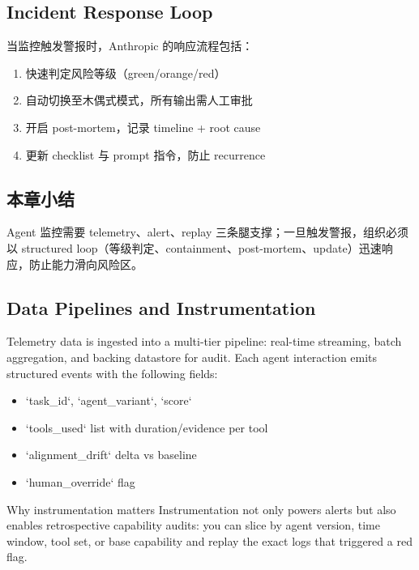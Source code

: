 \documentclass[a4paper]{article}
\begin{document}
\subsection{Incident Response Loop}

当监控触发警报时，Anthropic 的响应流程包括：

\begin{enumerate}
    \item 快速判定风险等级（green/orange/red）
    \item 自动切换至木偶式模式，所有输出需人工审批
    \item 开启 post-mortem，记录 timeline + root cause
    \item 更新 checklist 与 prompt 指令，防止 recurrence
\end{enumerate}

\subsection{本章小结}

Agent 监控需要 telemetry、alert、replay 三条腿支撑；一旦触发警报，组织必须以 structured loop（等级判定、containment、post-mortem、update）迅速响应，防止能力滑向风险区。

\subsection{Data Pipelines and Instrumentation}

Telemetry data is ingested into a multi-tier pipeline: real-time streaming, batch aggregation, and backing datastore for audit. Each agent interaction emits structured events with the following fields:

\begin{itemize}
    \item `task\_id`, `agent\_variant`, `score`
    \item `tools\_used` list with duration/evidence per tool
    \item `alignment\_drift` delta vs baseline
    \item `human\_override` flag
\end{itemize}

\begin{importantbox}{Why instrumentation matters}
Instrumentation not only powers alerts but also enables retrospective capability audits: you can slice by agent version, time window, tool set, or base capability and replay the exact logs that triggered a red flag.
\end{importantbox}
\end{document}
